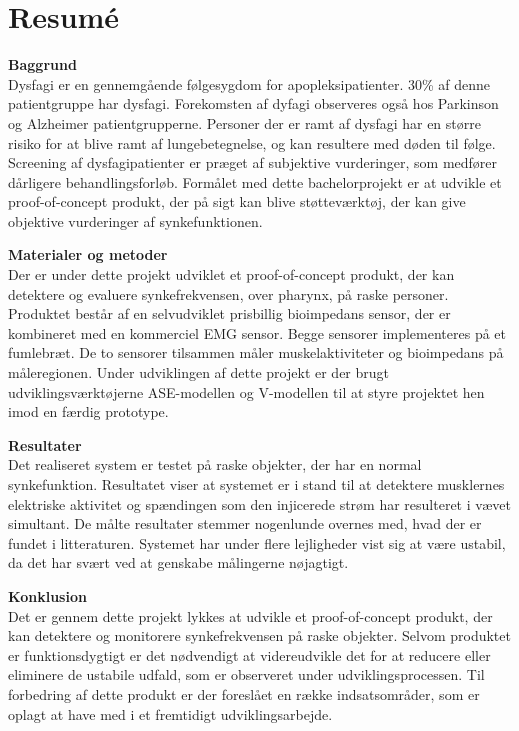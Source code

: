 \chapter{Resumé}

\textbf{Baggrund}\\
Dysfagi er en gennemgående følgesygdom for apopleksipatienter. 30\% af denne patientgruppe har dysfagi. Forekomsten af dyfagi observeres også hos Parkinson og Alzheimer patientgrupperne. Personer der er ramt af dysfagi har en større risiko for at blive ramt af lungebetegnelse, og kan resultere med døden til følge. Screening af dysfagipatienter er præget af subjektive vurderinger, som medfører dårligere behandlingsforløb. Formålet med dette bachelorprojekt er at udvikle et proof-of-concept produkt, der på sigt kan blive støtteværktøj, der kan give objektive vurderinger af synkefunktionen.

\textbf{Materialer og metoder}\\
Der er under dette projekt udviklet et proof-of-concept produkt, der kan detektere og evaluere synkefrekvensen, over pharynx, på raske personer. Produktet består af en selvudviklet prisbillig bioimpedans sensor, der er kombineret med en kommerciel EMG sensor. Begge sensorer implementeres på et fumlebræt. De to sensorer tilsammen måler  muskelaktiviteter og bioimpedans på måleregionen.   Under udviklingen af dette projekt er der brugt udviklingsværktøjerne ASE-modellen og V-modellen til at styre projektet hen imod en færdig prototype.  


\textbf{Resultater}\\
Det realiseret system er testet på raske objekter, der har en normal synkefunktion. Resultatet viser at systemet er i stand til at detektere musklernes elektriske aktivitet og spændingen som den injicerede strøm har resulteret i vævet simultant. De målte resultater stemmer nogenlunde overnes med, hvad der er fundet i litteraturen. Systemet har under flere lejligheder vist sig at være ustabil, da det har svært ved at genskabe målingerne nøjagtigt. 

\textbf{Konklusion}\\
Det er gennem dette projekt lykkes at udvikle et  proof-of-concept produkt, der kan detektere og monitorere synkefrekvensen på raske objekter. Selvom produktet  er funktionsdygtigt er det nødvendigt at videreudvikle det for at reducere eller eliminere de ustabile udfald, som er observeret under udviklingsprocessen. Til forbedring af dette produkt er der foreslået en række indsatsområder, som er oplagt at have med i et fremtidigt udviklingsarbejde.
